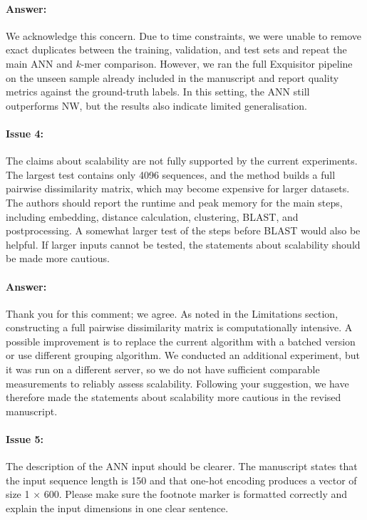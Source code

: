 \documentclass{article}
\begin{document}
\paragraph{Answer:}
We acknowledge this concern. Due to time constraints, we were unable to remove exact duplicates between the training, validation, and test sets and repeat the main ANN and $k$-mer comparison. 
However, we ran the full Exquisitor pipeline on the unseen sample already included in the manuscript and report quality metrics against the ground-truth labels.
In this setting, the ANN still outperforms NW, but the results also indicate limited generalisation.


\paragraph{Issue 4:}
\begin{displayquote}
The claims about scalability are not fully supported by the current experiments. The largest test contains only 4096 sequences, and the method builds a full pairwise dissimilarity matrix, which may become expensive for larger datasets. The authors should report the runtime and peak memory for the main steps, including embedding, distance calculation, clustering, BLAST, and postprocessing. A somewhat larger test of the steps before BLAST would also be helpful. If larger inputs cannot be tested, the statements about scalability should be made more cautious.
\end{displayquote}

\paragraph{Answer:}
Thank you for this comment; we agree. As noted in the Limitations section, constructing a full pairwise dissimilarity matrix is computationally intensive. 
A possible improvement is to replace the current algorithm with a batched version or use different grouping algorithm. 
We conducted an additional experiment, but it was run on a different server, so we do not have sufficient comparable measurements to reliably assess scalability.
Following your suggestion, we have therefore made the statements about scalability more cautious in the revised manuscript.


\paragraph{Issue 5:}
\begin{displayquote}
The description of the ANN input should be clearer. The manuscript states that the input sequence length is 150 and that one-hot encoding produces a vector of size 1 × 600. Please make sure the footnote marker is formatted correctly and explain the input dimensions in one clear sentence.
\end{displayquote}
\end{document}
